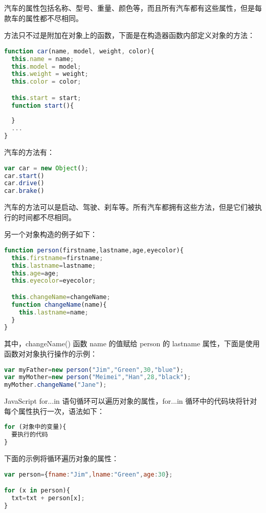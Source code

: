 汽车的属性包括名称、型号、重量、颜色等，而且所有汽车都有这些属性，但是每款车的属性都不尽相同。

方法只不过是附加在对象上的函数，下面是在构造器函数内部定义对象的方法：

\begin{lstlisting}[language=JavaScript]
function car(name, model, weight, color){
  this.name = name;
  this.model = model;
  this.weight = weight;
  this.color = color;

  this.start = start;
  function start(){
  
  }
  ...
}
\end{lstlisting}



汽车的方法有：


\begin{lstlisting}[language=JavaScript]
var car = new Object();
car.start()
car.drive()
car.brake()
\end{lstlisting}

汽车的方法可以是启动、驾驶、刹车等。所有汽车都拥有这些方法，但是它们被执行的时间都不尽相同。

另一个对象构造的例子如下：

\begin{lstlisting}[language=JavaScript]
function person(firstname,lastname,age,eyecolor){
  this.firstname=firstname;
  this.lastname=lastname;
  this.age=age;
  this.eyecolor=eyecolor;

  this.changeName=changeName;
  function changeName(name){
    this.lastname=name;
  }
}
\end{lstlisting}


其中，changeName() 函数 name 的值赋给 person 的 lastname 属性，下面是使用函数对对象执行操作的示例：


\begin{lstlisting}[language=JavaScript]
var myFather=new person("Jim","Green",30,"blue");
var myMother=new person("Meimei","Han",28,"black");
myMother.changeName("Jane");
\end{lstlisting}

JavaScript for...in 语句循环可以遍历对象的属性，for...in 循环中的代码块将针对每个属性执行一次，语法如下：

\begin{lstlisting}[language=JavaScript]
for (对象中的变量){
  要执行的代码
}
\end{lstlisting}

下面的示例将循环遍历对象的属性：

\begin{lstlisting}[language=JavaScript]
var person={fname:"Jim",lname:"Green",age:30};

for (x in person){
  txt=txt + person[x];
}
\end{lstlisting}




